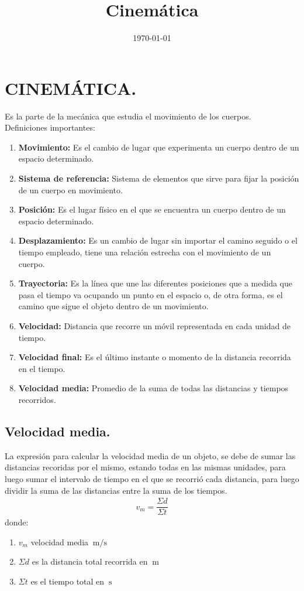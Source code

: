 \documentclass[14pt]{extarticle}
\title{\vspace*{-2cm} Cinemática \vspace{-5ex}}
\date{\today}
\begin{document}
\maketitle

\section{CINEMÁTICA.}

\noindent
Es la parte de la mecánica que estudia el movimiento de los cuerpos.
\\[0.5em]
\noindent
Definiciones importantes:
\begin{enumerate}
\item \textbf{Movimiento:} Es el cambio de lugar que experimenta un cuerpo dentro de un espacio determinado.
\item \textbf{Sistema de referencia:} Sistema de elementos que sirve para fijar la posición de un cuerpo en movimiento.
\item \textbf{Posición:} Es el lugar físico en el que se encuentra un cuerpo dentro de un espacio determinado.
\item \textbf{Desplazamiento:} Es un cambio de lugar sin importar el camino seguido o el tiempo empleado, tiene una relación estrecha con el movimiento de un cuerpo.
\item \textbf{Trayectoria:} Es la línea que une las diferentes posiciones que a medida que pasa el tiempo va ocupando un punto en el espacio o, de otra forma, es el camino que sigue el objeto dentro de un movimiento.
\item \textbf{Velocidad:} Distancia que recorre un móvil representada en cada unidad de tiempo.
\item \textbf{Velocidad final:} Es el último instante o momento de la distancia recorrida en el tiempo.
\item \textbf{Velocidad media:} Promedio de la suma de todas las distancias y tiempos recorridos.
\end{enumerate}

\newpage

\subsection{Velocidad media.}

La expresión para calcular la velocidad media de un objeto, se debe de sumar las distancias recoridas por el mismo, estando todas en las mismas unidades, para luego sumar el intervalo de tiempo en el que se recorrió cada distancia, para luego dividir la suma de las distancias entre la suma de los tiempos.
\begin{align*}
v_{m} = \dfrac{\Sigma d}{\Sigma t}
\end{align*}
donde:
\begin{enumerate}
\item $v_{m} $ velocidad media $\SI{}{\meter\per\second}$
\item $\Sigma d$ es la distancia total recorrida en $\SI{}{\meter}$
\item $\Sigma t$ es el tiempo total en $\SI{}{\second}$
\end{enumerate}
\end{document}
